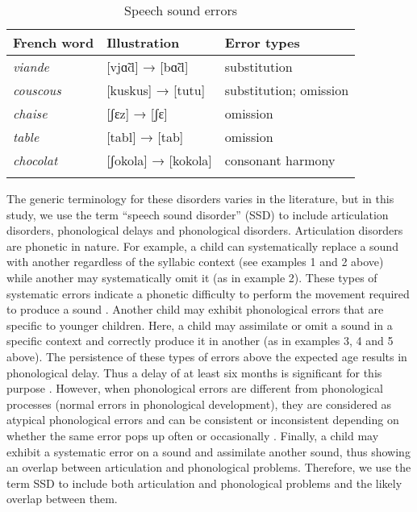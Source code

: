 \documentclass[output=paper,newtxmath,modfonts,nonflat,draftmode]{langsci/langscibook}
\begin{document}
\begin{table}
\caption{Speech sound errors\label{tab:takam:0}}
\begin{tabularx}{\textwidth}{XXX}
\lsptoprule
{French} {word}  & {Illustration} & {Error} {types}\\
\midrule
\textit{viande}  & [vjɑ̃d] → [bɑ̃d] & substitution \\
\textit{couscous}  & [kuskus] → [tutu] & substitution; omission\\
\textit{chaise}  & [ʃɛz] → [ʃɛ] & omission\\
\textit{table}  & [tabl] → [tab] & omission\\
\textit{chocolat}  & [ʃokola] → [kokola] & consonant harmony\\
\lspbottomrule
\end{tabularx}
\end{table}


The generic terminology for these disorders varies in the literature, but in this study, we use the term “speech sound disorder” (SSD) to include articulation disorders, phonological delays and phonological disorders. Articulation disorders are phonetic in nature. For example, a child can systematically replace a sound with another regardless of the syllabic context (see examples 1 and 2 above) while another may systematically omit it (as in example 2). These types of systematic errors indicate a phonetic difficulty to perform the movement required to produce a sound \citep{Fox2001}. Another child may exhibit phonological errors that are specific to younger children. Here, a child may assimilate or omit a sound in a specific context and correctly produce it in another (as in examples 3, 4 and 5 above). The persistence of these types of errors above the expected age results in phonological delay. Thus a delay of at least six months is significant for this purpose \citep{Dodd2013}. %
However, when phonological errors are different from phonological processes (normal errors in phonological development), they are considered as atypical phonological errors and can be consistent or inconsistent depending on whether the same error pops up often or occasionally \citep{Dodd2013}. Finally, a child may exhibit a systematic error on a sound and assimilate another sound, thus showing an overlap between articulation and phonological problems. Therefore, we use the term SSD to include both articulation and phonological problems and the likely overlap between them.
\end{document}
